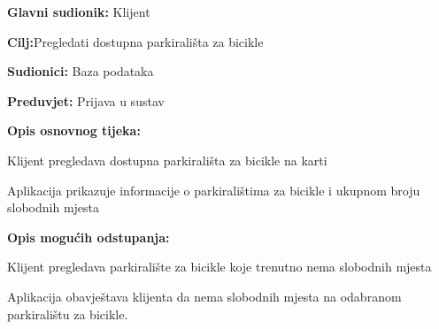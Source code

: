 \noindent {}
\begin{packed_item}
	
	\item \textbf{Glavni sudionik: }Klijent
	\item  \textbf{Cilj:}Pregledati dostupna parkirališta za bicikle
	\item  \textbf{Sudionici:} Baza podataka
	\item  \textbf{Preduvjet:} Prijava u sustav
	\item  \textbf{Opis osnovnog tijeka:}
	
	\item[] \begin{packed_enum}
		
		\item Klijent pregledava dostupna parkirališta za bicikle na karti
		\item Aplikacija prikazuje informacije o parkiralištima za bicikle i ukupnom broju slobodnih mjesta
		
	\end{packed_enum}
	
	\item  \textbf{Opis mogućih odstupanja:}
	
	\item[] \begin{packed_item}
		
		\item[2.a] Klijent pregledava parkiralište za bicikle koje trenutno nema slobodnih mjesta
		\item[] \begin{packed_enum}
			
			\item Aplikacija obavještava klijenta da nema slobodnih mjesta na odabranom parkiralištu za bicikle.
			
		\end{packed_enum}
		
	\end{packed_item}
	
\end{packed_item}

